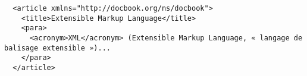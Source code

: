 \documentclass{article}
\begin{document}
\begin{verbatim}
  <article xmlns="http://docbook.org/ns/docbook">
    <title>Extensible Markup Language</title>
    <para>
      <acronym>XML</acronym> (Extensible Markup Language, « langage de balisage extensible »)...
    </para>
  </article>
\end{verbatim}
\end{document}
